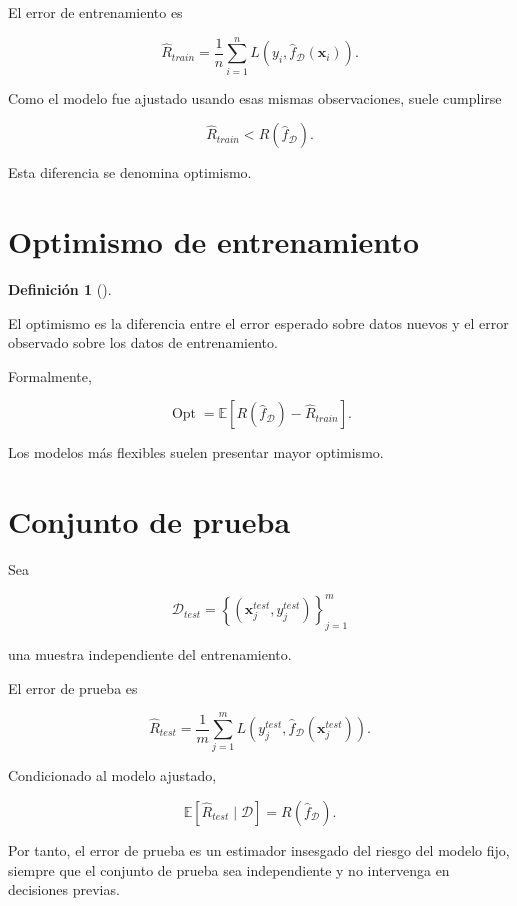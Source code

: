 \documentclass[
  spanish,
  11pt,
  letterpaper,
  DIV=11,
  numbers=noendperiod]{scrreprt}
\theoremstyle{definition}
\newtheorem{definition}{Definición}[chapter]
\theoremstyle{plain}
\theoremstyle{definition}
\theoremstyle{remark}
\begin{document}
El error de entrenamiento es

\[
\widehat{R}_{train}
=
\frac{1}{n}
\sum_{i=1}^{n}
L
\left(
y_i,
\widehat{f}_{\mathcal{D}}(\mathbf{x}_i)
\right).
\]

Como el modelo fue ajustado usando esas mismas observaciones, suele
cumplirse

\[
\widehat{R}_{train}
<
R(\widehat{f}_{\mathcal{D}}).
\]

Esta diferencia se denomina optimismo.

\section{Optimismo de entrenamiento}\label{optimismo-de-entrenamiento}

\begin{definition}[]\protect\hypertarget{def-optimismo}{}\label{def-optimismo}

El optimismo es la diferencia entre el error esperado sobre datos nuevos
y el error observado sobre los datos de entrenamiento.

\end{definition}

Formalmente,

\[
\operatorname{Opt}
=
\mathbb{E}
\left[
R(\widehat{f}_{\mathcal{D}})
-
\widehat{R}_{train}
\right].
\]

Los modelos más flexibles suelen presentar mayor optimismo.

\section{Conjunto de prueba}\label{conjunto-de-prueba}

Sea

\[
\mathcal{D}_{test}
=
\left\{
(\mathbf{x}^{test}_j,y^{test}_j)
\right\}_{j=1}^{m}
\]

una muestra independiente del entrenamiento.

El error de prueba es

\[
\widehat{R}_{test}
=
\frac{1}{m}
\sum_{j=1}^{m}
L
\left(
y^{test}_j,
\widehat{f}_{\mathcal{D}}(\mathbf{x}^{test}_j)
\right).
\]

Condicionado al modelo ajustado,

\[
\mathbb{E}
\left[
\widehat{R}_{test}
\mid
\mathcal{D}
\right]
=
R(\widehat{f}_{\mathcal{D}}).
\]

Por tanto, el error de prueba es un estimador insesgado del riesgo del
modelo fijo, siempre que el conjunto de prueba sea independiente y no
intervenga en decisiones previas.
\end{document}
